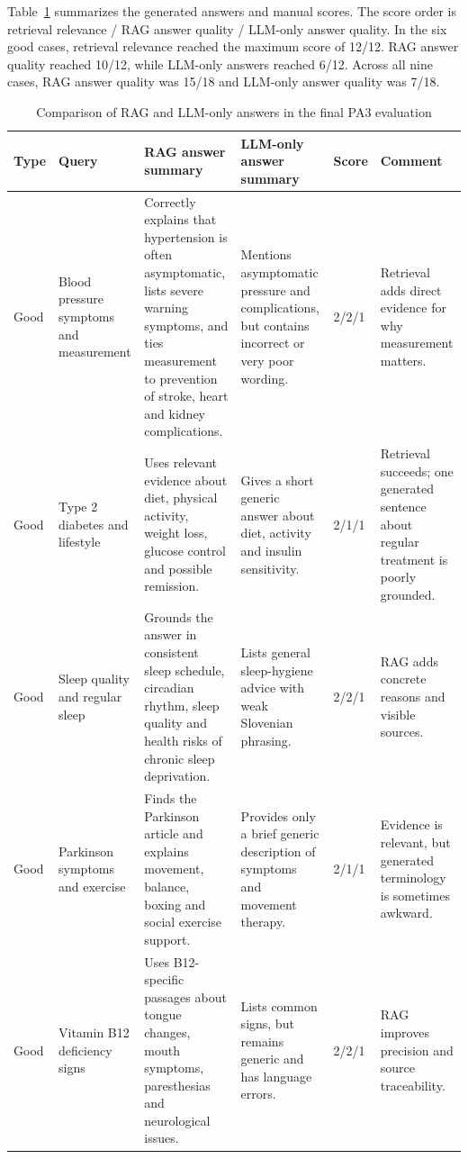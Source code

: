 \documentclass[9pt]{IEEEtran}
\begin{document}
Table~\ref{tab:results} summarizes the generated answers and manual scores.
The score order is retrieval relevance / RAG answer quality / LLM-only answer
quality.  In the six good cases, retrieval relevance reached the maximum score
of 12/12.  RAG answer quality reached 10/12, while LLM-only answers reached
6/12.  Across all nine cases, RAG answer quality was 15/18 and LLM-only answer
quality was 7/18.

\begin{table}[t]
\centering
\scriptsize
\caption{Comparison of RAG and LLM-only answers in the final PA3 evaluation}
\label{tab:results}
\setlength{\tabcolsep}{2pt}
\begin{tabular}{p{1.3cm}p{3.0cm}p{4.4cm}p{3.9cm}p{1.4cm}p{2.3cm}}
\toprule
\textbf{Type} & \textbf{Query} & \textbf{RAG answer summary} &
\textbf{LLM-only answer summary} & \textbf{Score} & \textbf{Comment} \\
\midrule
Good & Blood pressure symptoms and measurement &
Correctly explains that hypertension is often asymptomatic, lists severe
warning symptoms, and ties measurement to prevention of stroke, heart and
kidney complications. &
Mentions asymptomatic pressure and complications, but contains incorrect or
very poor wording. &
2/2/1 & Retrieval adds direct evidence for why measurement matters. \\

Good & Type 2 diabetes and lifestyle &
Uses relevant evidence about diet, physical activity, weight loss, glucose
control and possible remission. &
Gives a short generic answer about diet, activity and insulin sensitivity. &
2/1/1 & Retrieval succeeds; one generated sentence about regular treatment is
poorly grounded. \\

Good & Sleep quality and regular sleep &
Grounds the answer in consistent sleep schedule, circadian rhythm, sleep
quality and health risks of chronic sleep deprivation. &
Lists general sleep-hygiene advice with weak Slovenian phrasing. &
2/2/1 & RAG adds concrete reasons and visible sources. \\

Good & Parkinson symptoms and exercise &
Finds the Parkinson article and explains movement, balance, boxing and social
exercise support. &
Provides only a brief generic description of symptoms and movement therapy. &
2/1/1 & Evidence is relevant, but generated terminology is sometimes awkward. \\

Good & Vitamin B12 deficiency signs &
Uses B12-specific passages about tongue changes, mouth symptoms,
paresthesias and neurological issues. &
Lists common signs, but remains generic and has language errors. &
2/2/1 & RAG improves precision and source traceability. \\


\end{tabular}
\end{table}
\end{document}

